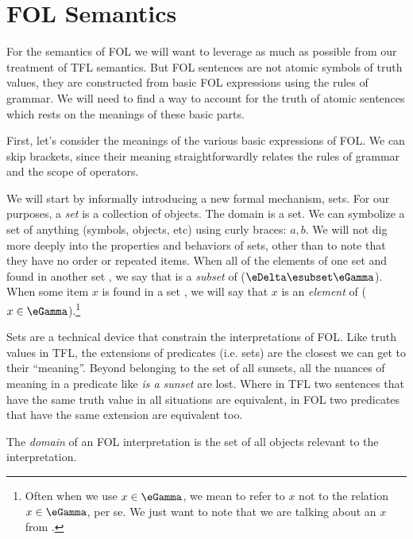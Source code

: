 \section{FOL Semantics}


For the semantics of FOL we will want to leverage as much as possible from our
treatment of TFL semantics. But FOL sentences are not atomic symbols of truth
values, they are constructed from basic FOL expressions using the rules of
grammar. We will need to find a way to account for the truth of atomic sentences
which rests on the meanings of these basic parts.

First, let's consider the meanings of the various basic expressions of FOL. We
can skip brackets, since their meaning straightforwardly relates the rules of
grammar and the scope of operators.

We will start by informally introducing a new formal mechanism, sets. For our
purposes, a \emph{set} is a collection of objects. The domain is a set. We can
symbolize a set of anything (symbols, objects, etc) using curly braces: ${a,b}$.
We will not dig more deeply into the properties and behaviors of sets, other
than to note that they have no order or repeated items. When all of the elements
of one set \eDelta and found in another set \eGamma, we say that \eDelta is a
\emph{subset} of \eGamma ($\eDelta\esubset\eGamma$). When some item $x$ is
found in a set \eGamma, we will say that $x$ is an \emph{element} of \eGamma
($x\in\eGamma$).\footnote{Often when we use $x\in\eGamma$, we mean to refer
to $x$ not to the relation $x\in\eGamma$, per se. We just want to note that
we are talking about an $x$ from \eGamma.}

Sets are a technical device that constrain the interpretations of FOL. Like
truth values in TFL, the extensions of predicates (i.e. sets) are the closest
we can get to their ``meaning''. Beyond belonging to the set of all sunsets,
all the nuances of meaning in a predicate like \emph{is a sunset} are lost.
Where in TFL two sentences that have the same truth value in all situations
are equivalent, in FOL two predicates that have the same extension are
equivalent too.

\begin{definition}[Domain]
  \label{def:fol-domain-set}
  The \emph{domain} of an FOL interpretation is the set of all objects relevant
  to the interpretation.
\end{definition}

